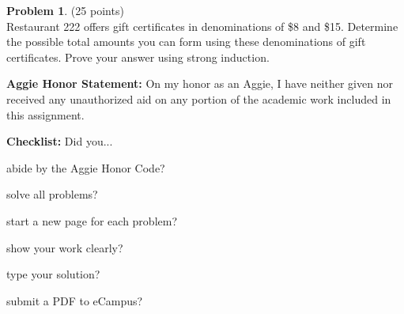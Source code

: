 \documentclass{article}
\theoremstyle{definition}
\newtheorem{problem}{Problem}
\newtheorem*{solution}{Solution}
\newcommand{\honor}{\noindent \textbf{Aggie Honor Statement: }On my honor as an Aggie, I have neither
  given nor received any unauthorized aid on any portion of the academic work included in this assignment.
}
\newcommand{\checklist}{\noindent\textbf{Checklist:}
Did you...
\begin{compactenum}
\item abide by the Aggie Honor Code?
\item solve all problems?
\item start a new page for each problem?
\item show your work clearly?
\item type your solution?
\item submit a PDF to eCampus?
\end{compactenum}
}
\begin{document}


\begin{problem} (25 points)\\
Restaurant 222 offers gift certificates in denominations of \$8 and \$15.  Determine the possible total amounts you can form using these denominations of gift certificates.  Prove your answer using strong induction.
\end{problem}



\bigskip
\honor

\bigskip
\checklist
\end{document}
